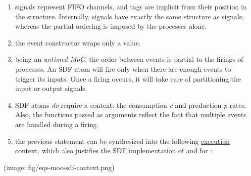                  \begin{enumerate}
                 \item 
                 signals represent FIFO channels, and tags are implicit from
 their position in the 
 structure. Internally,  signals have
 exactly the same structure as  signals,
 whereas the partial ordering is imposed by the processes alone.\par
                 
                 \item 
                 the  event constructor wraps only a
 value.\par
                 
                 \item 
                 being an \emph{untimed MoC}, the order between events is partial to
 the firings of processes. An SDF atom will fire only when there
 are enough events to trigger its inputs. Once a firing occurs, it
 will take care of partitioning the input or output signals.\par
                 
                 \item 
                 SDF atoms \emph{do} require a context: the consumption \emph{c} and
 production \emph{p} rates. Also, the functions passed as arguments
 reflect the fact that multiple events are handled during a
 firing.\par
                 
                 \item 
                 the previous statement can be synthesized into the following
 \href{ForSyDe-Atom-MoC.html#context}{execution context}, which also
 justifies the SDF implementation of  and
 for :\par
                 
                 \end{enumerate}
                 (image: fig/eqs-moc-sdf-context.png)\par
                 

